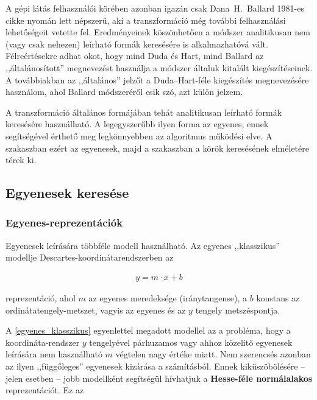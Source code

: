 A gépi látás felhasználói körében azonban igazán csak Dana~H.~Ballard 1981-es cikke \cite{hough_ballard} nyomán lett népszerű, aki a transzformáció még további felhasználási lehetőségeit vetette fel. Eredményeinek köszönhetően a módszer analitikusan nem (vagy csak nehezen) leírható formák keresésére is alkalmazhatóvá vált. Félreértésekre adhat okot, hogy mind Duda és Hart, mind Ballard az ,,általánosított'' megnevezést használja a módszer általuk kitalált kiegészítéseinek. A továbbiakban az ,,általános'' jelzőt a Duda--Hart-féle kiegészítés megnevezésére használom, ahol Ballard módszeréről esik szó, azt külön jelzem.

\bigskip

A transzformáció általános formájában tehát analitikusan leírható formák keresésére használható. A legegyszerűbb ilyen forma az egyenes, ennek segítségével érthető meg legkönnyebben az algoritmus működési elve. A  szakaszban ezért az egyenesek, majd a  szakaszban a körök keresésének elméletére térek ki.

\subsection{Egyenesek keresése}\label{sect:egyenesek_keresese}

\subsubsection{Egyenes-reprezentációk}\label{sect:egyenes_reprezentaciok}

Egyenesek leírására többféle modell használható. Az egyenes ,,klasszikus'' modellje Descartes-koordinátarendszerben az

\begin{align}\label{eq:egyenes_klasszikus}
y = m \cdot x + b
\end{align}

reprezentáció, ahol $ m $ az egyenes meredeksége (iránytangense), a $ b $ konstans az ordinátatengely-metszet, vagyis az egyenes és az $ y $ tengely metszéspontja.

A \eqref{egyenes_klasszikus} egyenlettel megadott modellel az a probléma, hogy a koordináta-rendszer $ y $ tengelyével párhuzamos vagy ahhoz közelítő egyenesek leírására nem használható $ m $ végtelen nagy értéke miatt. Nem szerencsés azonban az ilyen ,,függőleges'' egyenesek kizárása a számításból. Ennek kiküszöbölésére -- jelen esetben -- jobb modellként segítségül hívhatjuk a \textbf{Hesse-féle normálalakos} reprezentációt. Ez az

